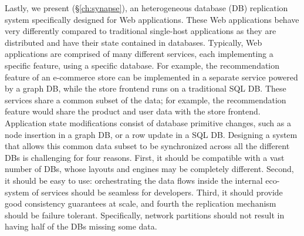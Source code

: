Lastly, we present \synapse (\S\ref{ch:synapse}), an heterogeneous database (DB)
replication system specifically designed for Web applications. These Web
applications behave very differently compared to traditional single-host
applications as they are distributed and have their state contained in
databases. Typically, Web applications are comprised of many different
services, each implementing a specific feature, using a specific database.
For example, the recommendation feature of an e-commerce store can be
implemented in a separate service powered by a graph DB, while the store
frontend runs on a traditional SQL DB. These services share a common subset
of the data; for example, the recommendation feature would share the product
and user data with the store frontend.
Application state modifications consist of database primitive changes, such as a
node insertion in a graph DB, or a row update in a SQL DB. 
Designing a system that allows this common data subset to be synchronized across
all the different DBs is challenging for four reasons. First, it should be
compatible with a vast number of DBs, whose layouts and engines may be
completely different. Second, it should be easy to use: orchestrating the data
flows inside the internal eco-system of services should be seamless for developers.
Third, it should provide good consistency guarantees at scale, and fourth
the replication mechanism should be failure tolerant. Specifically, network partitions
should not result in having half of the DBs missing some data.

